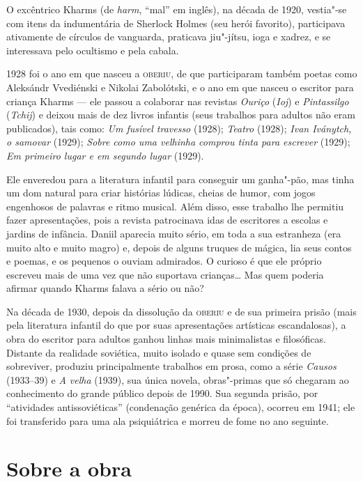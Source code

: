 O excêntrico Kharms (de \emph{harm}, ``mal'' em inglês), na década de
1920, vestia"-se com itens da indumentária de Sherlock Holmes (seu herói
favorito), participava ativamente de círculos de vanguarda, praticava
jiu"-jítsu, ioga e xadrez, e se interessava pelo ocultismo e pela cabala.

1928 foi o ano em que nasceu a \textsc{oberiu}, de que participaram também poetas
como Aleksándr Vvediénski e Nikolai Zabolótski, e o ano em que nasceu o
escritor para criança Kharms --- ele passou a colaborar nas revistas
\emph{Ouriço} (\emph{Ioj}) e \emph{Pintassilgo} (\emph{Tchij}) e deixou
mais de dez livros infantis (seus trabalhos para adultos não eram
publicados), tais como: \emph{Um fusível travesso} (1928); \emph{Teatro}
(1928); \emph{Ivan Iványtch, o samovar} (1929); \emph{Sobre como uma
velhinha comprou tinta para escrever} (1929); \emph{Em primeiro lugar e
em segundo lugar} (1929).

Ele enveredou para a literatura infantil para conseguir um ganha"-pão,
mas tinha um dom natural para criar histórias lúdicas, cheias de humor,
com jogos engenhosos de palavras e ritmo musical. Além disso, esse
trabalho lhe permitiu fazer apresentações, pois a revista patrocinava
idas de escritores a escolas e jardins de infância. Daniil aparecia
muito sério, em toda a sua estranheza (era muito alto e muito magro) e,
depois de alguns truques de mágica, lia seus contos e poemas, e os
pequenos o ouviam admirados. O curioso é que ele próprio escreveu mais
de uma vez que não suportava crianças\ldots{} Mas quem poderia afirmar quando
Kharms falava a sério ou não?

Na década de 1930, depois da dissolução da \textsc{oberiu} e de sua primeira
prisão (mais pela literatura infantil do que por suas apresentações
artísticas escandalosas), a obra do escritor para adultos ganhou linhas
mais minimalistas e filosóficas. Distante da realidade soviética, muito
isolado e quase sem condições de sobreviver, produziu principalmente
trabalhos em prosa, como a série \emph{Causos} (1933--39) e \emph{A
velha} (1939), sua única novela, obras"-primas que só chegaram ao
conhecimento do grande público depois de 1990. Sua segunda prisão, por
``atividades antissoviéticas'' (condenação genérica da época), ocorreu
em 1941; ele foi transferido para uma ala psiquiátrica e morreu de fome
no ano seguinte.

\section{Sobre a obra}

